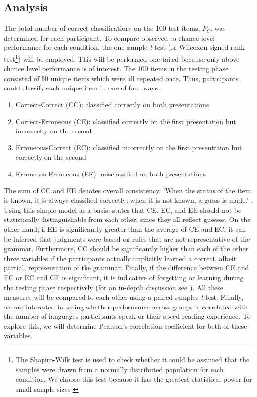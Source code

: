 \subsection{Analysis}
The total number of correct classifications on the 100 test items, $P_{C}$, was determined for each participant. To compare observed to chance level performance for each condition, the one-sample \textit{t}-test (or Wilcoxon signed rank test\footnote{The Shapiro-Wilk test is used to check whether it could be assumed that the samples were drawn from a normally distributed population for each condition. We choose this test because it has the greatest statistical power for small sample sizes \citep{yazici2007comparison}}) will be employed. This will be performed one-tailed because only above chance level performance is of interest.
The 100 items in the testing phase consisted of 50 unique items which were all repeated once. Thus, participants could classify each unique item in one of four ways:
\begin{enumerate}
\item Correct-Correct (CC): classified correctly on both presentations
\item Correct-Erroneous (CE): classified correctly on the first presentation but incorrectly on the second
\item Erroneous-Correct (EC): classified incorrectly on the first presentation but correctly on the second
\item Erroneous-Erroneous (EE): misclassified on both presentations
\end{enumerate}
The sum of CC and EE denotes overall consistency. `When the status of the item is known, it is always classified correctly; when it is not known, a guess is made.' \citep[p.~227]{reber1989implicit}. Using this simple model as a basis, \citeauthor{reber1989implicit} states that CE, EC, and EE should not be statistically distinguishable from each other, since they all reflect guesses. On the other hand, if EE is significantly greater than the average of CE and EC, it can be inferred that judgments were based on rules that are not representative of the grammar. Furthermore, CC should be significantly higher than each of the other three variables if the participants actually implicitly learned a correct, albeit partial, representation of the grammar. Finally, if the difference between CE and EC or EC and CE is significant, it is indicative of forgetting or learning during the testing phase respectively (for an in-depth discussion see \citet{reber1989implicit}). All these measures will be compared to each other using a paired-samples \textit{t}-test. 
Finally, we are interested in seeing whether performance across groups is correlated with the number of languages participants speak or their speed reading experience. To explore this, we will determine Pearson's correlation coefficient for both of these variables.
